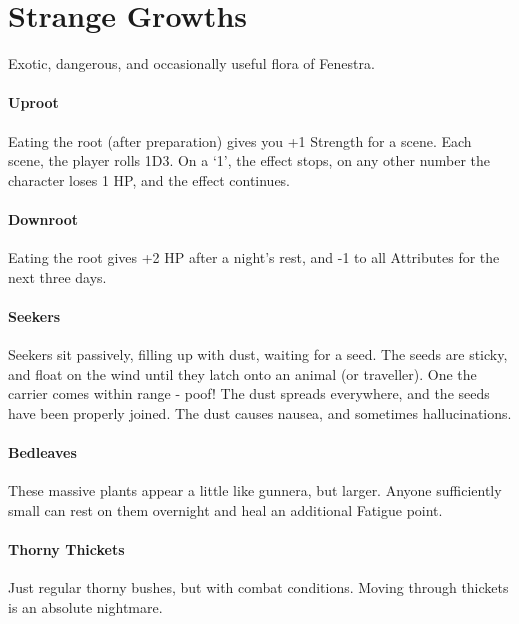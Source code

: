 \chapter{Strange Growths}

\begin{multicols}{2}

Exotic, dangerous, and occasionally useful flora of Fenestra.

\subsubsection{Uproot}

Eating the root (after preparation) gives you +1 Strength for a scene.
Each scene, the player rolls 1D3.
On a `1', the effect stops, on any other number the character loses 1 HP, and the effect continues.

\subsubsection{Downroot}

Eating the root gives +2 HP after a night's rest, and -1 to all Attributes for the next three days.

\subsubsection{Seekers}

Seekers sit passively, filling up with dust, waiting for a seed.
The seeds are sticky, and float on the wind until they latch onto an animal (or traveller).
One the carrier comes within range - poof!
The dust spreads everywhere, and the seeds have been properly joined.
The dust causes nausea, and sometimes hallucinations.

\subsubsection{Bedleaves}

These massive plants appear a little like gunnera, but larger.
Anyone sufficiently small can rest on them overnight and heal an additional Fatigue point.

\subsubsection{Thorny Thickets}

Just regular thorny bushes, but with combat conditions.
Moving through thickets is an absolute nightmare.


\end{multicols}
